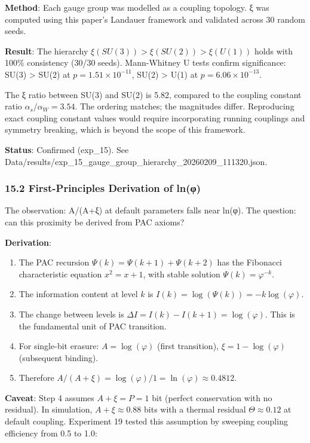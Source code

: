 \documentclass[
  11pt,
  a4paper]{article}
\providecommand{\tightlist}{%
  \setlength{\itemsep}{0pt}\setlength{\parskip}{0pt}}
\begin{document}
\textbf{Method}: Each gauge group was modelled as a coupling topology. ξ
was computed using this paper's Landauer framework and validated across
30 random seeds.

\textbf{Result}: The hierarchy \(\xi(SU(3)) > \xi(SU(2)) > \xi(U(1))\)
holds with 100\% consistency (30/30 seeds). Mann-Whitney U tests confirm
significance: SU(3) \textgreater{} SU(2) at
\(p = 1.51 \times 10^{-11}\), SU(2) \textgreater{} U(1) at
\(p = 6.06 \times 10^{-13}\).

The ξ ratio between SU(3) and SU(2) is 5.82, compared to the coupling
constant ratio \(\alpha_s / \alpha_W = 3.54\). The ordering matches; the
magnitudes differ. Reproducing exact coupling constant values would
require incorporating running couplings and symmetry breaking, which is
beyond the scope of this framework.

\textbf{Status}: Confirmed (exp\_15). See
Data/results/exp\_15\_gauge\_group\_hierarchy\_20260209\_111320.json.

\subsubsection{15.2 First-Principles Derivation of
ln(φ)}\label{first-principles-derivation-of-lnux3c6}

The observation: A/(A+ξ) at default parameters falls near ln(φ). The
question: can this proximity be derived from PAC axioms?

\textbf{Derivation}:

\begin{enumerate}
\def\labelenumi{\arabic{enumi}.}
\tightlist
\item
  The PAC recursion \(\Psi(k) = \Psi(k+1) + \Psi(k+2)\) has the
  Fibonacci characteristic equation \(x^2 = x + 1\), with stable
  solution \(\Psi(k) = \varphi^{-k}\).
\item
  The information content at level \(k\) is
  \(I(k) = \log(\Psi(k)) = -k \log(\varphi)\).
\item
  The change between levels is
  \(\Delta I = I(k) - I(k+1) = \log(\varphi)\). This is the fundamental
  unit of PAC transition.
\item
  For single-bit erasure: \(A = \log(\varphi)\) (first transition),
  \(\xi = 1 - \log(\varphi)\) (subsequent binding).
\item
  Therefore
  \(A/(A+\xi) = \log(\varphi) / 1 = \ln(\varphi) \approx 0.4812\).
\end{enumerate}

\textbf{Caveat}: Step 4 assumes \(A + \xi = P = 1\) bit (perfect
conservation with no residual). In simulation, \(A + \xi \approx 0.88\)
bits with a thermal residual \(\Theta \approx 0.12\) at default
coupling. Experiment 19 tested this assumption by sweeping coupling
efficiency from 0.5 to 1.0:
\end{document}

